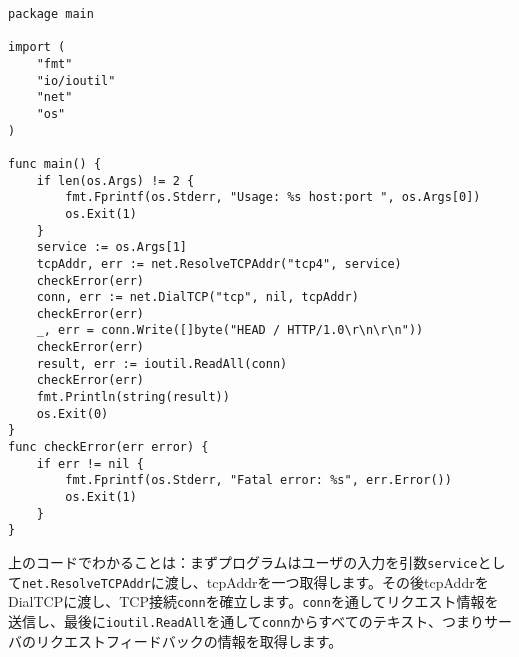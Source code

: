 \begin{lstlisting}[numbers=none]
package main

import (
    "fmt"
    "io/ioutil"
    "net"
    "os"
)

func main() {
    if len(os.Args) != 2 {
        fmt.Fprintf(os.Stderr, "Usage: %s host:port ", os.Args[0])
        os.Exit(1)
    }
    service := os.Args[1]
    tcpAddr, err := net.ResolveTCPAddr("tcp4", service)
    checkError(err)
    conn, err := net.DialTCP("tcp", nil, tcpAddr)
    checkError(err)
    _, err = conn.Write([]byte("HEAD / HTTP/1.0\r\n\r\n"))
    checkError(err)
    result, err := ioutil.ReadAll(conn)
    checkError(err)
    fmt.Println(string(result))
    os.Exit(0)
}
func checkError(err error) {
    if err != nil {
        fmt.Fprintf(os.Stderr, "Fatal error: %s", err.Error())
        os.Exit(1)
    }
}
\end{lstlisting}

上のコードでわかることは：まずプログラムはユーザの入力を引数\texttt{service}として\texttt{net.ResolveTCPAddr}に渡し、tcpAddrを一つ取得します。その後tcpAddrをDialTCPに渡し、TCP接続\texttt{conn}を確立します。\texttt{conn}を通してリクエスト情報を送信し、最後に\texttt{ioutil.ReadAll}を通して\texttt{conn}からすべてのテキスト、つまりサーバのリクエストフィードバックの情報を取得します。

